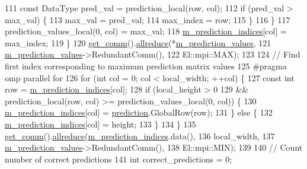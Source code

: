 \begin{DoxyCode}
111       \textcolor{keyword}{const} DataType pred\_val = prediction\_local(row, col);
112       \textcolor{keywordflow}{if} (pred\_val > max\_val) \{
113         max\_val = pred\_val;
114         max\_index = row;
115       \}
116     \}
117     prediction\_values\_local(0, col) = max\_val;
118     \hyperlink{classlbann_1_1categorical__accuracy__metric_a369a86a91f08f3ad3b12b870ccf2e427}{m\_prediction\_indices}[col] = max\_index;
119   \}
120   \hyperlink{classlbann_1_1metric_a464120720df6bfdf91bffe353e562964}{get\_comm}().\hyperlink{classlbann_1_1lbann__comm_af5631e5f0f54e4df4958eba9df2599ef}{allreduce}(*\hyperlink{classlbann_1_1categorical__accuracy__metric_a796e50da721050d30e0cea709484154e}{m\_prediction\_values},
121                        \hyperlink{classlbann_1_1categorical__accuracy__metric_a796e50da721050d30e0cea709484154e}{m\_prediction\_values}->RedundantComm(),
122                        El::mpi::MAX);
123 
124   \textcolor{comment}{// Find first index corresponding to maximum prediction matrix values}
125 \textcolor{preprocessor}{  #pragma omp parallel for}
126   \textcolor{keywordflow}{for} (\textcolor{keywordtype}{int} col = 0; col < local\_width; ++col) \{
127     \textcolor{keyword}{const} \textcolor{keywordtype}{int} row = \hyperlink{classlbann_1_1categorical__accuracy__metric_a369a86a91f08f3ad3b12b870ccf2e427}{m\_prediction\_indices}[col];
128     \textcolor{keywordflow}{if} (local\_height > 0
129         && prediction\_local(row, col) >= prediction\_values\_local(0, col)) \{
130       \hyperlink{classlbann_1_1categorical__accuracy__metric_a369a86a91f08f3ad3b12b870ccf2e427}{m\_prediction\_indices}[col] = \hyperlink{base_8hpp_a2781a159088df64ed7d47cc91c4dc0a8ac41b9ec75e920b610e8907e066074b30}{prediction}.GlobalRow(row);
131     \} \textcolor{keywordflow}{else} \{
132       \hyperlink{classlbann_1_1categorical__accuracy__metric_a369a86a91f08f3ad3b12b870ccf2e427}{m\_prediction\_indices}[col] = height;
133     \}
134   \}
135   \hyperlink{classlbann_1_1metric_a464120720df6bfdf91bffe353e562964}{get\_comm}().\hyperlink{classlbann_1_1lbann__comm_af5631e5f0f54e4df4958eba9df2599ef}{allreduce}(\hyperlink{classlbann_1_1categorical__accuracy__metric_a369a86a91f08f3ad3b12b870ccf2e427}{m\_prediction\_indices}.data(),
136                        local\_width,
137                        \hyperlink{classlbann_1_1categorical__accuracy__metric_a796e50da721050d30e0cea709484154e}{m\_prediction\_values}->RedundantComm(),
138                        El::mpi::MIN);
139 
140   \textcolor{comment}{// Count number of correct predictions}
141   \textcolor{keywordtype}{int} correct\_predictions = 0;

\end{DoxyCode}
